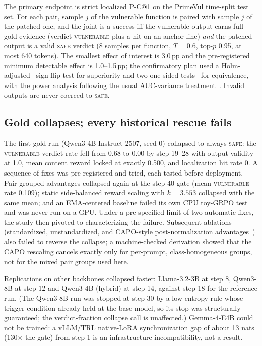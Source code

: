 \documentclass[journal]{IEEEtran}
\makeatletter
\newcommand{\vuln}{\textsc{vulnerable}}
\newcommand{\safe}{\textsc{safe}}
\newcommand{\pc}{P-C@1}
\makeatother
\begin{document}
The primary endpoint is strict localized \pc{} on the PrimeVul time-split test set. For each pair, sample $j$ of the vulnerable function is paired with sample $j$ of the patched one, and the joint is a success iff the vulnerable output earns full gold evidence (verdict \vuln{} plus a hit on an anchor line) \emph{and} the patched output is a valid \safe{} verdict (8 samples per function, $T{=}0.6$, top-$p$ 0.95, at most 640 tokens). The smallest effect of interest is 3.0\,pp and the pre-registered minimum detectable effect is 1.0--1.5\,pp; the confirmatory plan used a Holm-adjusted~\cite{holm} sign-flip test for superiority and two one-sided tests~\cite{schuirmann} for equivalence, with the power analysis following the usual AUC-variance treatment~\cite{hanley}. Invalid outputs are never coerced to \safe{}.

\subsection{Gold collapses; every historical rescue fails}
The first gold run (Qwen3-4B-Instruct-2507, seed 0) collapsed to always-\safe{}: the \vuln{} verdict rate fell from 0.68 to 0.00 by step 19--28 with output validity at 1.0, mean content reward locked at exactly 0.500, and localization hit rate 0. A sequence of fixes was pre-registered and tried, each tested before deployment. Pair-grouped advantages collapsed again at the step-40 gate (mean \vuln{} rate 0.109); static side-balanced reward scaling with $k{=}3.553$ collapsed with the same mean; and an EMA-centered baseline failed its own CPU toy-GRPO test and was never run on a GPU. Under a pre-specified limit of two automatic fixes, the study then pivoted to characterizing the failure. Subsequent ablations (standardized, unstandardized, and CAPO-style post-normalization advantages~\cite{rlfourhs}) also failed to reverse the collapse; a machine-checked derivation showed that the CAPO rescaling cancels exactly only for per-prompt, class-homogeneous groups, not for the mixed pair groups used here.

Replications on other backbones collapsed faster: Llama-3.2-3B at step 8, Qwen3-8B at step 12 and Qwen3-4B (hybrid) at step 14, against step 18 for the reference run. (The Qwen3-8B run was stopped at step 30 by a low-entropy rule whose trigger condition already held at the base model, so its stop was structurally guaranteed; the verdict-fraction collapse call is unaffected.) Gemma-4-E4B could not be trained: a vLLM/TRL native-LoRA synchronization gap of about 13 nats (130$\times$ the gate) from step 1 is an infrastructure incompatibility, not a result.
\end{document}
